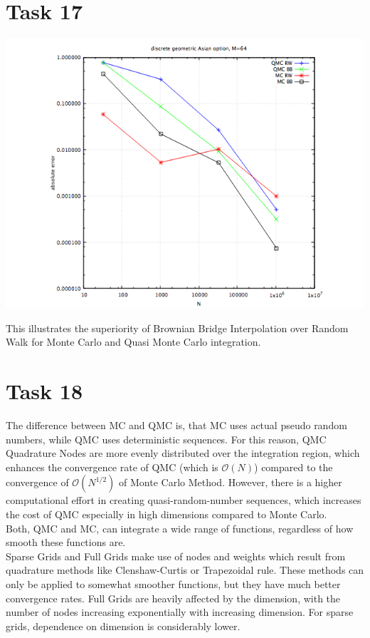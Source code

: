 \documentclass[10pt,a4paper]{article}
\begin{document}
\section*{Task 17}
\begin{center}
\includegraphics[scale=0.42]{task17.png}
\end{center}
This illustrates the superiority of Brownian Bridge Interpolation over
Random Walk for Monte Carlo and Quasi Monte Carlo integration. 

\section*{Task 18}

The difference between MC and QMC is, that MC uses actual pseudo random numbers, while QMC uses deterministic sequences. For this reason, QMC Quadrature Nodes are more evenly distributed over the integration region, which enhances the convergence rate of QMC (which is $\mathcal{O}(N)$) compared to the convergence of $\mathcal{O}(N^{1/2})$ of Monte Carlo Method. However, there is a higher computational effort in creating quasi-random-number sequences, which increases the cost of QMC especially in high dimensions compared to Monte Carlo. \\

Both, QMC and MC, can integrate a wide range of functions, regardless of how smooth these functions are. \\

Sparse Grids and Full Grids make use of nodes and weights which result from quadrature methods like Clenshaw-Curtis or Trapezoidal rule. These methods can only be applied to somewhat smoother functions, but they have much better convergence rates. 
Full Grids are heavily affected by the dimension, with the number of nodes increasing exponentially with increasing dimension. For sparse grids, dependence on dimension is considerably lower. \\
\end{document}
